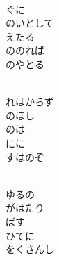 \documentclass[10pt,b5j]{tarticle} %
\begin{document}
\vspace{1.5em} %
\newcommand{\linespace}{0.5em} %
\newcommand{\blocksize}{0.5\hsize} %
\newcommand{\itemmargin}{6em} %
\begin{enumerate} %
    \setlength{\itemindent}{\itemmargin} %
    \begin{minipage}[c]{\blocksize}
    
        \vspace{\linespace}
        \item~\\
        ぐに\\
        のいとして\\
        えたる\\
        ののれば\\
        のやとる
        
        \vspace{\linespace}
        \item~\\
        れはからず\\
        のほし\\
        のは\\
        にに\\
        すはのぞ
        
        \vspace{\linespace}
        \item~\\
        ゆるの\\
        がはたり\\
        ばす\\
        ひてに\\
        をくさんし
    
    \end{minipage}
\end{enumerate} %
\end{document}
